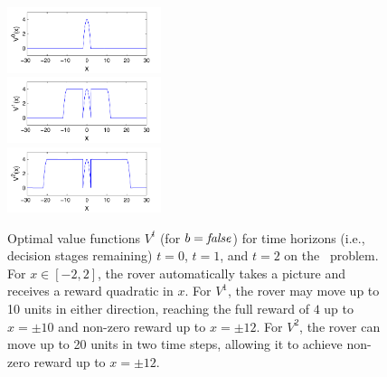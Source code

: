 \begin{figure}[t!]
\centering
\includegraphics[width=0.4\textwidth]{Figures1/v1_mr.pdf}\\
\includegraphics[width=0.4\textwidth]{Figures1/v2_mr.pdf}\\
\includegraphics[width=0.4\textwidth]{Figures1/v3_mr.pdf}
\vspace{-2mm}
\caption{\footnotesize Optimal value functions $V^t$ (for $b =
\mathit{false}$) for time horizons (i.e., decision stages remaining) $t=0$,
$t=1$, and $t=2$ on the \MarsRover\ problem.  For $x \in [-2,2]$, the
rover automatically takes a picture and receives a reward quadratic in
$x$.  For $V^1$, the rover may move up to 10 units in
either direction, reaching the full reward of $4$ up
to $x = \pm 10$ and non-zero reward up to $x = \pm 12$. 
For $V^2$, the rover can move up to 20 units in two time steps,
allowing it to achieve non-zero reward up to $x = \pm 12$.}
\label{fig:opt_graph}
\end{figure}


